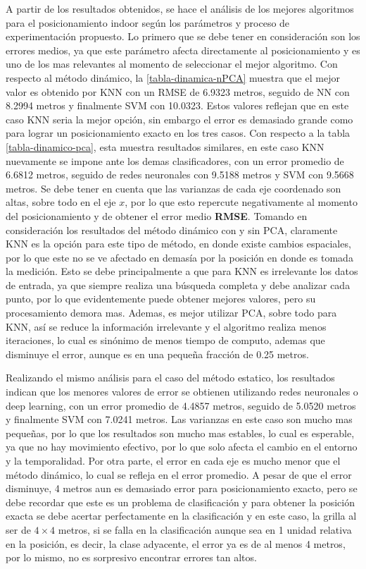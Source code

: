 A partir de los resultados obtenidos, se hace el análisis de los mejores algoritmos para el posicionamiento indoor según los parámetros y proceso de experimentación propuesto. Lo primero que se debe tener en consideración son los errores medios, ya que este parámetro afecta directamente al posicionamiento y es uno de los mas relevantes al momento de seleccionar el mejor algoritmo. Con respecto al método dinámico, la \autoref{tabla-dinamica-nPCA} muestra que el mejor valor es obtenido por KNN con un RMSE de 6.9323 metros, seguido de NN con 8.2994 metros y finalmente SVM con 10.0323. Estos valores reflejan que en este caso KNN seria la mejor opción, sin embargo el error es demasiado grande como para lograr un posicionamiento exacto en los tres casos. Con respecto a la tabla \ref{tabla-dinamico-pca}, esta muestra resultados similares, en este caso KNN nuevamente se impone ante los demas clasificadores, con un error promedio de 6.6812 metros, seguido de redes neuronales con 9.5188 metros y SVM con 9.5668 metros. Se debe tener en cuenta que las varianzas de cada eje coordenado son altas, sobre todo en el eje $x$, por lo que esto repercute negativamente al momento del posicionamiento y de obtener el error medio \textbf{RMSE}. Tomando en consideración los resultados del método dinámico con y sin PCA, claramente KNN es la opción para este tipo de método, en donde existe cambios espaciales, por lo que este no se ve afectado en demasía por la posición en donde es tomada la medición. Esto se debe principalmente a que para KNN es irrelevante los datos de entrada, ya que siempre realiza una búsqueda completa y debe analizar cada punto, por lo que evidentemente puede obtener mejores valores, pero su procesamiento demora mas. Ademas, es mejor utilizar PCA, sobre todo para KNN, así se reduce la información irrelevante y el algoritmo realiza menos iteraciones, lo cual es sinónimo de menos tiempo de computo, ademas que disminuye el error, aunque es en una pequeña fracción de 0.25 metros.

Realizando el mismo análisis para el caso del método estatico, los resultados indican que los menores valores de error se obtienen utilizando redes neuronales o deep learning, con un error promedio de 4.4857 metros, seguido de 5.0520 metros y finalmente SVM con 7.0241 metros. Las varianzas en este caso son mucho mas pequeñas, por lo que los resultados son mucho mas estables, lo cual es esperable, ya que no hay movimiento efectivo, por lo que solo afecta el cambio en el entorno y la temporalidad. Por otra parte, el error en cada eje es mucho menor que el método dinámico, lo cual se refleja en el error promedio. A pesar de que el error disminuye, 4 metros aun es demasiado error para posicionamiento exacto, pero se debe recordar que este es un problema de clasificación y para obtener la posición exacta se debe acertar perfectamente en la clasificación y en este caso, la grilla al ser de $4 \times 4$ metros, si se falla en la clasificación aunque sea en 1 unidad relativa en la posición, es decir, la clase adyacente, el error ya es de al menos 4 metros, por lo mismo, no es sorpresivo encontrar errores tan altos. 

